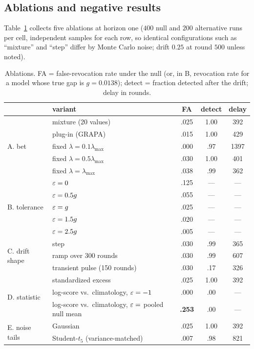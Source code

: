\subsection{Ablations and negative results}\label{sec:exp-abl}

Table~\ref{tab:abl} collects five ablations at horizon one ($400$ null and $200$ alternative runs per cell, independent samples for each row, so identical configurations such as ``mixture'' and ``step'' differ by Monte Carlo noise; drift $0.25$ at round $500$ unless noted).

\begin{table}[t]\centering
\caption{Ablations. FA = false-revocation rate under the null (or, in B, revocation rate for a model whose true gap is $g=0.0138$); detect = fraction detected after the drift; delay in rounds.}
\label{tab:abl}
\small
\begin{tabular}{@{}llccc@{}}
\toprule
 & variant & FA & detect & delay \\
\midrule
\multirow{5}{*}{A. bet} & mixture (20 values) & .025 & 1.00 & 392 \\
 & plug-in (GRAPA) & .015 & 1.00 & 429 \\
 & fixed $\lambda=0.1\lambda_{\max}$ & .000 & .97 & 1397 \\
 & fixed $\lambda=0.5\lambda_{\max}$ & .030 & 1.00 & 401 \\
 & fixed $\lambda=\lambda_{\max}$ & .038 & .99 & 362 \\
\midrule
\multirow{5}{*}{B. tolerance} & $\varepsilon=0$ & .125 & --- & --- \\
 & $\varepsilon=0.5g$ & .055 & --- & --- \\
 & $\varepsilon=g$ & .025 & --- & --- \\
 & $\varepsilon=1.5g$ & .020 & --- & --- \\
 & $\varepsilon=2.5g$ & .005 & --- & --- \\
\midrule
\multirow{3}{*}{C. drift shape} & step & .030 & .99 & 365 \\
 & ramp over 300 rounds & .030 & .99 & 607 \\
 & transient pulse (150 rounds) & .030 & .17 & 326 \\
\midrule
\multirow{3}{*}{D. statistic} & standardized excess & .025 & 1.00 & 392 \\
 & log-score vs.\ climatology, $\varepsilon=-1$ & .000 & .00 & --- \\
 & log-score vs.\ climatology, $\varepsilon=$ pooled null mean & \textbf{.253} & .00 & --- \\
\midrule
\multirow{2}{*}{E. noise tails} & Gaussian & .025 & 1.00 & 392 \\
 & Student-$t_5$ (variance-matched) & .007 & .98 & 821 \\
\bottomrule
\end{tabular}
\end{table}

